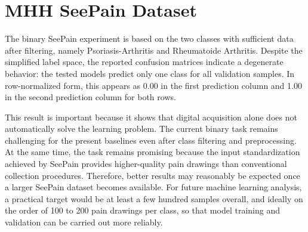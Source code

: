 \documentclass[12pt]{report}
\begin{document}
\clearpage
\section{MHH SeePain Dataset}

The binary SeePain experiment is based on the two classes with sufficient data after filtering, namely Psoriasis-Arthritis and Rheumatoide Arthritis. Despite the simplified label space, the reported confusion matrices indicate a degenerate behavior: the tested models predict only one class for all validation samples. In row-normalized form, this appears as 0.00 in the first prediction column and 1.00 in the second prediction column for both rows.

This result is important because it shows that digital acquisition alone does not automatically solve the learning problem. The current binary task remains challenging for the present baselines even after class filtering and preprocessing. At the same time, the task remains promising because the input standardization achieved by SeePain provides higher-quality pain drawings than conventional collection procedures. Therefore, better results may reasonably be expected once a larger SeePain dataset becomes available. For future machine learning analysis, a practical target would be at least a few hundred samples overall, and ideally on the order of 100 to 200 pain drawings per class, so that model training and validation can be carried out more reliably.
\end{document}
